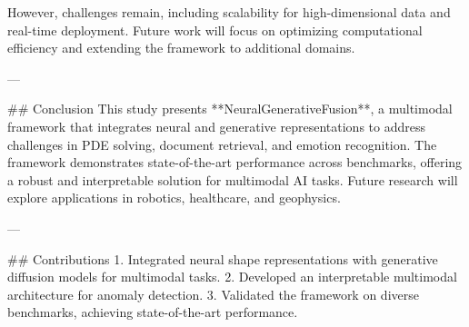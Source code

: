 However, challenges remain, including scalability for high-dimensional data and real-time deployment. Future work will focus on optimizing computational efficiency and extending the framework to additional domains.

---

## Conclusion
This study presents **NeuralGenerativeFusion**, a multimodal framework that integrates neural and generative representations to address challenges in PDE solving, document retrieval, and emotion recognition. The framework demonstrates state-of-the-art performance across benchmarks, offering a robust and interpretable solution for multimodal AI tasks. Future research will explore applications in robotics, healthcare, and geophysics.

---

## Contributions
1. Integrated neural shape representations with generative diffusion models for multimodal tasks.
2. Developed an interpretable multimodal architecture for anomaly detection.
3. Validated the framework on diverse benchmarks, achieving state-of-the-art performance. 

